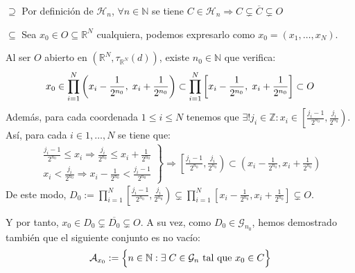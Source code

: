 \documentclass[12pt,a4paper]{article}
\newcommand{\R}{\mathbb{R}}
\newcommand{\N}{\mathbb{N}}
\newcommand{\Z}{\mathbb{Z}}
\begin{document}
\begin{tcolorbox}
    $\supseteq$ \hspace{4mm} Por definición de $\mathcal{H}_n$, \hspace{2mm}
    $\forall n \in \N$ se tiene $C \in \mathcal{H}_n \Rightarrow C \subsetneq \overline{C} \subsetneq  O$
\end{tcolorbox}
\begin{tcolorbox}
    $\subseteq $ \hspace{4mm}
    Sea $x_0 \in O \subseteq \R^N$ cualquiera, podemos expresarlo como $x_0 = (x_1, \ldots, x_N)$.
\end{tcolorbox}
Al ser $O$ abierto en $(\R^N, \tau_{\R^N}(d))$, existe $n_0 \in \N$ que verifica:
$$x_0 \in \prod_{i=1}^N \left(x_i - \frac{1}{2^{n_0}},\hspace{1mm}  x_i + \frac{1}{2^{n_0}}\right) \subset \prod_{i=1}^N \left[x_i - \frac{1}{2^{n_0}}, \hspace{1mm} x_i + \frac{1}{2^{n_0}}\right] \subset O$$
Además, para cada coordenada $1 \leq i \leq N$ tenemos que $\exists ! j_i \in \Z : x_i \in \left[\frac{j_i -1}{2^{n_0}}, \frac{j_i}{2^{n_0}} \right)$.
Así, para cada $i \in {1, \ldots, N}$ se tiene que:
\begin{align*}
    \left. \begin{array}{l}
        \frac{j_i - 1}{2^{n_0}} \leq x_i \Rightarrow \frac{j_i}{2^{n_0}} \leq x_i + \frac{1}{2^{n_0}} \\
        x_i < \frac{j_i}{2^{n_0}} \Rightarrow x_i - \frac{1}{2^{n_0}} < \frac{j_i - 1}{2^{n_0}}
    \end{array} \right\} \textstyle
    \Rightarrow \left[\frac{j_i -1}{2^{n_0}}, \frac{j_i}{2^{n_0}} \right) \subset \left(x_i - \frac{1}{2^{n_0}}, x_i + \frac{1}{2^{n_0}} \right)
\end{align*}
De este modo, $D_0 := \displaystyle \prod_{i=1}^{N}\left[\frac{j_i-1}{2^{n_0}}, \frac{j_i}{2^{n_0}} \right) \subsetneq \prod_{i=1}^{N}\left[x_i - \frac{1}{2^{n_0}}, x_i + \frac{1}{2^{n_0}} \right] \subsetneq O$.

\vspace{3mm} \noindent
Y por tanto, $x_0 \in D_0 \subsetneq \overline{D_0} \subsetneq O$. A su vez, como $D_0 \in \mathcal{G}_{n_0}$, hemos demostrado también
que el siguiente conjunto es no vacío: \\[-2.5ex]
$$\mathcal{A}_{x_0} := \Big\{n \in \N : \exists \hspace{1mm} C \in \mathcal{G}_n \text{ tal que } x_0 \in C\Big\} $$
\end{document}

